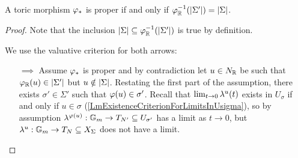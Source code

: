 \begin{theorem}[]\label{ThPropernessConditionForToricMorphism}
A toric morphism $\varphi_\ast$ is proper if and only if $\varphi_{\mathbb{R}}^{-1}(\left|{\Sigma'}\right|)=\left|{\Sigma}\right|$.
\end{theorem}
\begin{proof}
Note that the inclusion $\left|{\Sigma}\right|\subseteq \varphi_{\mathbb{R}}^{-1}(\left|{\Sigma'}\right|)$ is true by definition. 

We use the valuative criterion for both arrows:
\setlength{\leftmargini}{0cm}
\begin{itemize}
\item[$\boxed{\implies}$] Assume $\varphi_\ast$ is proper and by contradiction let $u\in N_{\mathbb{R}}$ be such that $\varphi_{\mathbb{R}}(u)\in \left|{\Sigma'}\right|$ but $u\notin \left|{\Sigma}\right|$. Restating the first part of the assumption, there exists $\sigma'\in \Sigma'$ such that $\varphi(u)\in \sigma'$. Recall that $\lim_{t\to 0}\lambda^u(t)$ exists in $U_\sigma$ if and only if $u\in \sigma$ (\ref{LmExistenceCriterionForLimitsInUsigma}), so by assumption $\lambda^{\varphi(u)}:\mathbb{G}_m\to T_{N'}\subseteq U_{\sigma'}$ has a limit as $t\to 0$, but $\lambda^u:\mathbb{G}_m\to T_N\subseteq X_{\Sigma}$ does not have a limit. 


\end{itemize}
\end{proof}
